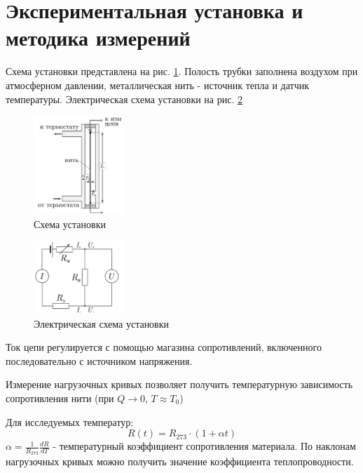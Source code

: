 \documentclass[a4paper,12pt]{article} %
\begin{document}
\section{Экспериментальная установка и методика измерений}
Схема установки представлена на рис. \ref{схема}. Полость трубки заполнена воздухом при атмосферном давлении, металлическая нить - источник тепла и датчик температуры. Электрическая схема установки на рис. \ref{электричество}
\begin{figure}[H]
	\begin{center}
		\includegraphics[width=0.3\textwidth]{Схема}
	\end{center}
	\caption{Схема установки} \label{схема}
\end{figure}

\begin{figure}[H]
	\begin{center}
		\includegraphics[width=0.3\textwidth]{Электричество}
	\end{center}
	\caption{Электрическая схема установки} \label{электричество}
\end{figure}
Ток цепи регулируется с помощью магазина сопротивлений, включенного последовательно с источником напряжения.

Измерение нагрузочных кривых позволяет получить температурную зависимость сопротивления нити (при $Q \to 0$, $T\approx T_0$)

Для исследуемых температур:
\begin{equation}
	R(t)=R_{273}\cdot(1+\alpha t)
\end{equation}
$\alpha=\frac{1}{R_{273}}\frac{dR}{dT}$  - температурный коэффициент сопротивления материала. По наклонам нагрузочных кривых можно получить значение коэффициента теплопроводности.
\end{document}
